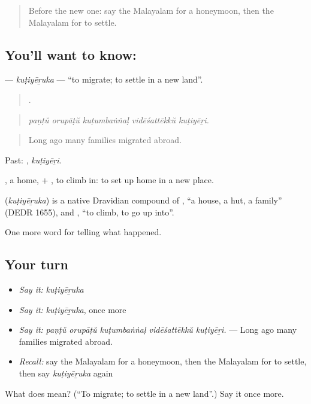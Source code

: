 \label{lesson:ML-C389-kutiyeruka}



\begin{quote}
Before the new one: say the Malayalam for a honeymoon, then the Malayalam for to settle.
\end{quote}

\subsection*{You'll want to know: }
\textbf{} — \emph{kuṭiyēṟuka} — \textquotedblleft{}to migrate; to settle in a new land\textquotedblright{}.

\begin{quote}
    .
\end{quote}

\begin{quote}
\emph{paṇṭŭ orupāṭŭ kuṭumbaṅṅaḷ vidēśattēkkŭ kuṭiyēṟi.}
\end{quote}

\begin{quote}
Long ago many families migrated abroad.
\end{quote}

Past: , \emph{kuṭiyēṟi}.

, a home, + , to climb in: to set up home in a new place.

\begin{cousinweb}
\textbf{} (\emph{kuṭiyēṟuka}) is a native Dravidian compound of , \textquotedblleft{}a house, a hut, a family\textquotedblright{} (DEDR 1655), and , \textquotedblleft{}to climb, to go up into\textquotedblright{}.
\end{cousinweb}

\begin{grammarlens}[title={What you've built}]
One more word for telling what happened.
\end{grammarlens}

\subsection*{Your turn}
\begin{itemize}
\raggedright
  \item \emph{Say it:} \emph{kuṭiyēṟuka}
  \item \emph{Say it:} \emph{kuṭiyēṟuka}, once more
  \item \emph{Say it:} \emph{paṇṭŭ orupāṭŭ kuṭumbaṅṅaḷ vidēśattēkkŭ kuṭiyēṟi.} — Long ago many families migrated abroad.
  \item \emph{Recall:} say the Malayalam for a honeymoon, then the Malayalam for to settle, then say \emph{kuṭiyēṟuka} again
\end{itemize}

\begin{tcolorbox}[breakable,colback=teal!4,colframe=teal!35!black,title={Before you move on}]
What does  mean? (\textquotedblleft{}To migrate; to settle in a new land\textquotedblright{}.) Say it once more.
\end{tcolorbox}
